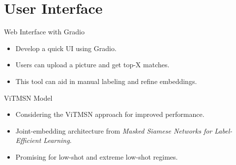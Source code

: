 \documentclass{beamer}
\begin{document}
\section{User Interface}
\begin{frame}{Web Interface with Gradio}
\begin{itemize}
    \item Develop a quick UI using Gradio.
    \item Users can upload a picture and get top-X matches.
    \item This tool can aid in manual labeling and refine embeddings.
\end{itemize}
\end{frame}


\begin{frame}{ViTMSN Model}
\begin{itemize}
    \item Considering the ViTMSN approach for improved performance.
    \item Joint-embedding architecture from \emph{Masked Siamese Networks for Label-Efficient Learning}.
    \item Promising for low-shot and extreme low-shot regimes.
\end{itemize}
\end{frame}
\end{document}
